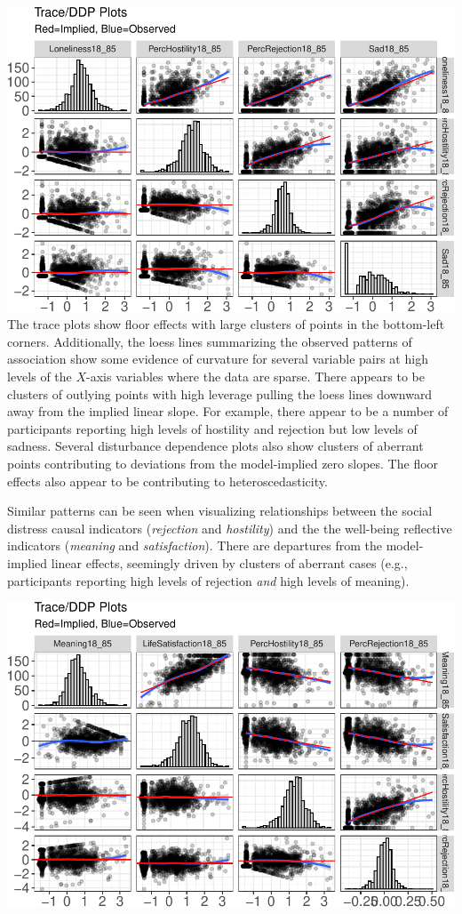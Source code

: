 \documentclass[
  english,
  doc]{apa6}
\begin{document}
\includegraphics{flexplavaan_draft_files/figure-latex/unnamed-chunk-4-1.pdf}
The trace plots show floor effects with large clusters of points in the bottom-left corners. Additionally, the loess lines summarizing the observed patterns of association show some evidence of curvature for several variable pairs at high levels of the \(X\)-axis variables where the data are sparse. There appears to be clusters of outlying points with high leverage pulling the loess lines downward away from the implied linear slope. For example, there appear to be a number of participants reporting high levels of hostility and rejection but low levels of sadness. Several disturbance dependence plots also show clusters of aberrant points contributing to deviations from the model-implied zero slopes. The floor effects also appear to be contributing to heteroscedasticity.

Similar patterns can be seen when visualizing relationships between the social distress causal indicators (\emph{rejection} and \emph{hostility}) and the the well-being reflective indicators (\emph{meaning} and \emph{satisfaction}). There are departures from the model-implied linear effects, seemingly driven by clusters of aberrant cases (e.g., participants reporting high levels of rejection \emph{and} high levels of meaning).

\includegraphics{flexplavaan_draft_files/figure-latex/unnamed-chunk-5-1.pdf}
\end{document}
